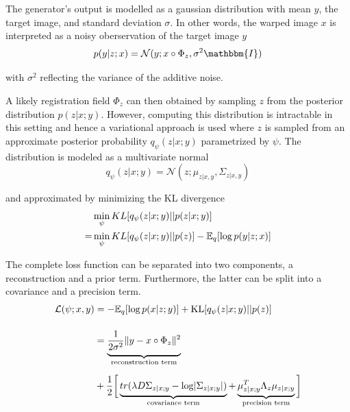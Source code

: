 The generator's output is modelled as a gaussian distribution with mean $y$, the target image, and standard deviation $\sigma$. In other words, the warped image $x$ is interpreted as a noisy oberservation of the target image $y$
\begin{equation}
	p(y|z;x) = \mathcal{N}(y; x \circ \Phi_z, \sigma^2 \mathbbm{I})
\end{equation}

with $\sigma^2$ reflecting the variance of the additive noise.

A likely registration field $\Phi_z$ can then obtained by sampling $z$ from the posterior distribution $p(z | x; y)$.
However, computing this distribution is intractable in this setting and hence a variational approach is used where $z$ is sampled from an approximate posterior probability $q_\psi(z | x; y)$ parametrized by $\psi$. The distribution is modeled as a multivariate normal
\begin{equation}
	q_\psi(z | x; y) = \mathcal{N}(z; \mu_{z | x, y}, \Sigma_{z | x, y})
\end{equation}

and approximated by minimizing the KL divergence
\begin{equation}
	\begin{split}
		  &\min_\psi KL [ q_\psi(z | x; y) || p(z | x; y) ] \\
		= &\min_\psi KL [ q_\psi(z | x; y) || p(z) ] - \mathbb{E}_q [ \log p(y | z; x) ]
	\end{split}
\end{equation}

The complete loss function can be separated into two components, a reconstruction and a prior term. Furthermore, the latter can be split into a covariance and a precision term.
\begin{equation} \label{eq:voxloss}
	\begin{split}
		\mathcal{L}(\psi; x, y)
		& = -\E_{q}[ \log p( x | z; y ) ]
		+ \text{KL} [ q_{\psi} ( z | x ; y ) || p ( z ) ] \\[12pt]
		& = \underbrace{
			\frac{1}{2 \sigma^2} \norm{y - x \circ \Phi_{z}}^{2} \vphantom{\frac{1}{2_{2_2}}}
		}_{\text{reconstruction term}} \\[6pt]
		& + \frac{1}{2} \bigg[
		\underbrace{
			tr( \lambda D \Sigma_{z | x; y} - \log \abs{ \Sigma_{z | x; y} } ) \vphantom{\mu_{z | x; y}^{T}}
		}_{\text{covariance term}} +
		\underbrace{
			\mu_{z | x; y}^{T} \Lambda_{z} \mu_{z | x; y}
		}_{\text{precision term}} \bigg]
	\end{split}
\end{equation}

